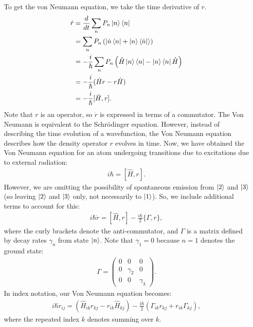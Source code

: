 \documentclass{article}
\theoremstyle{definition}
\begin{document}
To get the von Neumann equation, we take the time derivative of $r$.
\begin{align}
\dot{r} &= \frac{d}{dt}\sum_{n}P_n\ket{n}\bra{n}\nonumber\\
&= \sum_{n}P_n\left(\ket{\dot{n}\bra{n} + \ket{n}\bra{\dot{n}}} \right) \nonumber\\
&= -\frac{i}{\hbar}\sum_{n}P_n\left( \hat{H}\ket{n}\bra{n} - \ket{n}\bra{n}\hat{H}\right) \nonumber\\
&= -\frac{i}{\hbar}(\hat{H}r - r\hat{H})\nonumber\\
&= -\frac{i}{\hbar}[\hat{H},r].
\end{align}
Note that $r$ is an operator, so $\dot{r}$ is expressed in terms of a commutator. The Von Neumann is equivalent to the Schr\"{o}dinger equation. However, instead of describing the time evolution of a wavefunction, the Von Neumann equation describes how the density operator $r$ evolves in time. Now, we have obtained the Von Neumann equation for an atom undergoing transitions due to excitations due to external radiation:
\begin{align}
i\hbar = [\hat{H},r].
\end{align}
However, we are omitting the possibility of spontaneous emission from $\ket{2}$ and $\ket{3}$ (so leaving $\ket{2}$ and $\ket{3}$ only, not necessarily to $\ket{1}$). So, we include additional terms to account for this:
\begin{align}
i\hbar\dot{r} = [\hat{H},r] - \frac{i\hbar}{2}\{\Gamma, r\},
\end{align}
where the curly brackets denote the anti-commutator, and $\Gamma$ is a matrix defined by decay rates $\gamma_n$ from state $\ket{n}$. Note that $\gamma_1 = 0$ because $n=1$ denotes the ground state:
\begin{align}
\Gamma = \begin{pmatrix}
0 & 0 & 0\\
0 & \gamma_2 & 0\\
0 & 0 & \gamma_3
\end{pmatrix}.
\end{align}
In index notation, our Von Neumann equation becomes:
\begin{align}
i\hbar\dot{r}_{ij} = \left( \hat{H}_{ik}r_{kj} - r_{ik}\hat{H}_{kj}\right) - \frac{i\hbar}{2}\left(\Gamma_{ik}r_{kj} + r_{ik}\Gamma_{kj} \right),
\end{align}
where the repeated index $k$ denotes summing over $k$.




	
\end{document}
